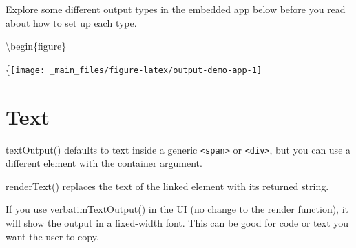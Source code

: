 \documentclass[
]{book}
\newenvironment{Shaded}{\begin{snugshade}}{\end{snugshade}}
\newcommand{\AttributeTok}[1]{\textcolor[rgb]{0.77,0.63,0.00}{#1}}
\newcommand{\CommentTok}[1]{\textcolor[rgb]{0.56,0.35,0.01}{\textit{#1}}}
\newcommand{\FunctionTok}[1]{\textcolor[rgb]{0.00,0.00,0.00}{#1}}
\newcommand{\NormalTok}[1]{#1}
\newcommand{\OtherTok}[1]{\textcolor[rgb]{0.56,0.35,0.01}{#1}}
\newcommand{\SpecialCharTok}[1]{\textcolor[rgb]{0.00,0.00,0.00}{#1}}
\newcommand{\StringTok}[1]{\textcolor[rgb]{0.31,0.60,0.02}{#1}}
\begin{document}
Explore some different output types in the embedded app below before you read about how to set up each type.

\textbackslash begin\{figure\}

\{\centering \href{https://shiny.psy.gla.ac.uk/debruine/output_demo/}{\texttt{[image: \_main\_files/figure-latex/output-demo-app-1]} }

\hypertarget{text}{%
\section{Text}\label{text}}

textOutput() defaults to text inside a generic \texttt{\textless{}span\textgreater{}} or \texttt{\textless{}div\textgreater{}}, but you can use a different element with the container argument.

\begin{Shaded}
\end{Shaded}

renderText() replaces the text of the linked element with its returned string.

\begin{Shaded}
\end{Shaded}

If you use verbatimTextOutput() in the UI (no change to the render function), it will show the output in a fixed-width font. This can be good for code or text you want the user to copy.

\begin{Shaded}
\end{Shaded}
\end{document}
